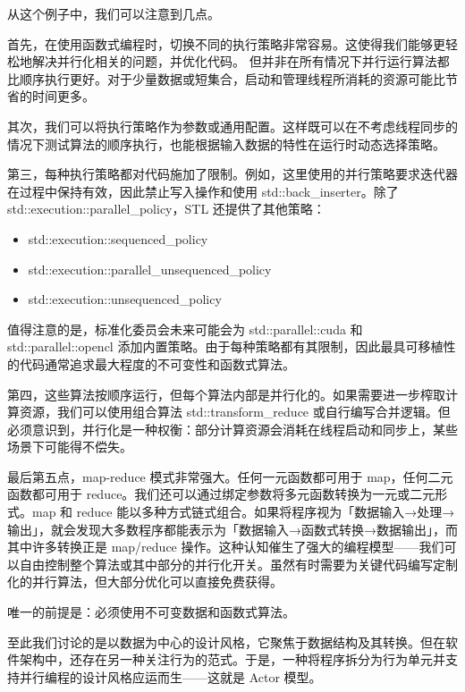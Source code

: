 从这个例子中，我们可以注意到几点。

首先，在使用函数式编程时，切换不同的执行策略非常容易。这使得我们能够更轻松地解决并行化相关的问题，并优化代码。
但并非在所有情况下并行运行算法都比顺序执行更好。对于少量数据或短集合，启动和管理线程所消耗的资源可能比节省的时间更多。

其次，我们可以将执行策略作为参数或通用配置。这样既可以在不考虑线程同步的情况下测试算法的顺序执行，也能根据输入数据的特性在运行时动态选择策略。

第三，每种执行策略都对代码施加了限制。例如，这里使用的并行策略要求迭代器在过程中保持有效，因此禁止写入操作和使用 std::back\_inserter。除了 std::execution::parallel\_policy，STL 还提供了其他策略：

\begin{itemize}
\item 
std::execution::sequenced\_policy

\item 
std::execution::parallel\_unsequenced\_policy

\item 
std::execution::unsequenced\_policy
\end{itemize}

值得注意的是，标准化委员会未来可能会为 std::parallel::cuda 和 std::parallel::opencl 添加内置策略。由于每种策略都有其限制，因此最具可移植性的代码通常追求最大程度的不可变性和函数式算法。

第四，这些算法按顺序运行，但每个算法内部是并行化的。如果需要进一步榨取计算资源，我们可以使用组合算法 std::transform\_reduce 或自行编写合并逻辑。但必须意识到，并行化是一种权衡：部分计算资源会消耗在线程启动和同步上，某些场景下可能得不偿失。

最后第五点，map-reduce 模式非常强大。任何一元函数都可用于 map，任何二元函数都可用于 reduce。我们还可以通过绑定参数将多元函数转换为一元或二元形式。map 和 reduce 能以多种方式链式组合。如果将程序视为「数据输入→处理→输出」，就会发现大多数程序都能表示为「数据输入→函数式转换→数据输出」，而其中许多转换正是 map/reduce 操作。这种认知催生了强大的编程模型——我们可以自由控制整个算法或其中部分的并行化开关。虽然有时需要为关键代码编写定制化的并行算法，但大部分优化可以直接免费获得。

唯一的前提是：必须使用不可变数据和函数式算法。

至此我们讨论的是以数据为中心的设计风格，它聚焦于数据结构及其转换。但在软件架构中，还存在另一种关注行为的范式。于是，一种将程序拆分为行为单元并支持并行编程的设计风格应运而生——这就是 Actor 模型。









